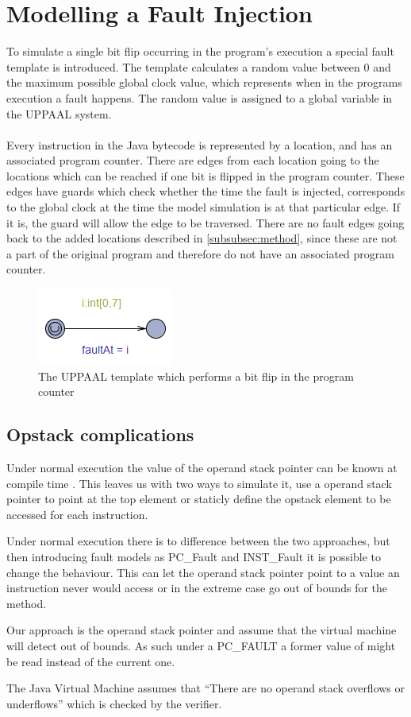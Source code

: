 \section{Modelling a Fault Injection}
To simulate a single bit flip occurring in the program's execution a special fault template is introduced. The template calculates a random value between $0$ and the maximum possible global clock value, which represents when in the programs execution a fault happens. The random value is assigned to a global variable in the UPPAAL system.\\\\
Every instruction in the Java bytecode is represented by a location, and has an associated program counter. There are edges from each location going to the locations which can be reached if one bit is flipped in the program counter. These edges have guards which check whether the time the fault is injected, corresponds to the global clock at the time the model simulation is at that particular edge. If it is, the guard will allow the edge to be traversed. There are no fault edges going back to the added locations described in \cref{subsubsec:method}, since these are not a part of the original program and therefore do not have an associated program counter.
\begin{figure}[H]
\centering
\includegraphics{figures/fault.PNG}
\caption{The UPPAAL template which performs a bit flip in the program counter}
\end{figure}


\subsection{Opstack complications}
Under normal execution the value of the operand stack pointer can be known at compile  time . This leaves us with two ways to simulate it, use a operand stack pointer to point at the top element or staticly define the opstack element to be accessed for each instruction.

Under normal execution there is to difference between the two approaches, but then introducing fault models as PC\_Fault and INST\_Fault it is possible to change the behaviour. This can let the operand stack pointer point to a value an instruction never would access or in the extreme case go out of bounds for the method.

Our approach is the operand stack pointer and assume that the virtual machine will detect out of bounds. As such under a PC\_FAULT a former value of might be read instead of the current one.

The Java Virtual Machine assumes that ``There are no operand stack overflows or underflows'' \cite[c. 4.10]{java_specc} which is checked by the verifier.
